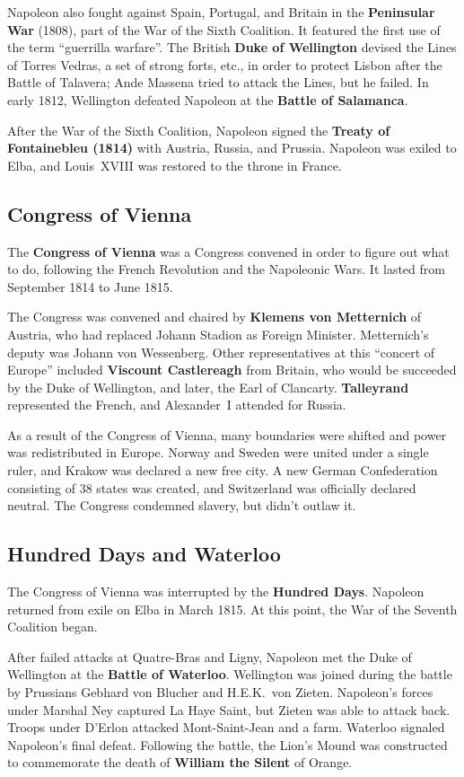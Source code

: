 Napoleon also fought against Spain, Portugal, and Britain in the \textbf{Peninsular War} (1808),
part of the War of the Sixth Coalition.
It featured the first use of the term ``guerrilla warfare''.
The British \textbf{Duke of Wellington} devised the Lines of Torres Vedras, a set of strong forts, etc.,
in order to protect Lisbon after the Battle of Talavera;
Ande Massena tried to attack the Lines, but he failed.
In early 1812, Wellington defeated Napoleon at the \textbf{Battle of Salamanca}.

After the War of the Sixth Coalition,
Napoleon signed the \textbf{Treaty of Fontainebleu (1814)} with Austria, Russia, and Prussia.
Napoleon was exiled to Elba, and Louis~XVIII was restored to the throne in France.

\subsection*{Congress of Vienna}

The \textbf{Congress of Vienna} was a Congress convened in order to figure out what to do,
following the French Revolution and the Napoleonic Wars.
It lasted from September 1814 to June 1815.

The Congress was convened and chaired by \textbf{Klemens von Metternich} of Austria,
who had replaced Johann Stadion as Foreign Minister.
Metternich's deputy was Johann von Wessenberg.
Other representatives at this ``concert of Europe'' included
\textbf{Viscount Castlereagh} from Britain, who would be succeeded by the Duke of Wellington,
and later, the Earl of Clancarty.
\textbf{Talleyrand} represented the French,
and Alexander~I attended for Russia.

As a result of the Congress of Vienna, many boundaries were shifted and power was redistributed in Europe.
Norway and Sweden were united under a single ruler, and Krakow was declared a new free city.
A new German Confederation consisting of 38 states was created,
and Switzerland was officially declared neutral.
The Congress condemned slavery, but didn't outlaw it.

\subsection*{Hundred Days and Waterloo}
The Congress of Vienna was interrupted by the \textbf{Hundred Days}.
Napoleon returned from exile on Elba in March 1815.
At this point, the War of the Seventh Coalition began.

After failed attacks at Quatre-Bras and Ligny,
Napoleon met the Duke of Wellington at the \textbf{Battle of Waterloo}.
Wellington was joined during the battle by Prussians Gebhard von Blucher and H.E.K.\ von Zieten.
Napoleon's forces under Marshal Ney captured La Haye Saint, but Zieten was able to attack back.
Troops under D'Erlon attacked Mont-Saint-Jean and a farm.
Waterloo signaled Napoleon's final defeat.
Following the battle, the Lion's Mound was constructed
to commemorate the death of \textbf{William the Silent} of Orange.

